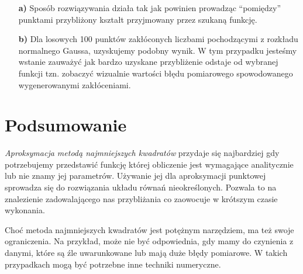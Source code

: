\documentclass{article}
\begin{document}
    \begin{enumerate}
      \item[\bf{a)}] Sposób rozwiązywania działa tak jak powinien prowadząc ``pomiędzy'' punktami przybliżony kształt przyjmowany przez szukaną funkcję.
      \item[\bf{b)}] Dla losowych 100 punktów zakłóconych liczbami pochodzącymi z rozkładu normalnego Gaussa, uzyskujemy podobny wynik. W tym przypadku jesteśmy wstanie zauważyć jak bardzo uzyskane przybliżenie odstaje od wybranej funkcji tzn. zobaczyć wizualnie wartości błędu pomiarowego spowodowanego wygenerowanymi zakłóceniami.
    \end{enumerate}


  \section{Podsumowanie}
  \textit{Aproksymacja metodą najmniejszych kwadratów} przydaje się najbardziej gdy potrzebujemy przedstawić funkcję której obliczenie jest wymagające analitycznie lub nie znamy jej parametrów. Używanie jej dla aproksymacji punktowej sprowadza się do rozwiązania układu równań nieokreślonych. Pozwala to na znalezienie zadowalającego nas przybliżania co zaowocuje w krótszym czasie wykonania.

  Choć metoda najmniejszych kwadratów jest potężnym narzędziem, ma też swoje ograniczenia. Na przykład, może nie być odpowiednia, gdy mamy do czynienia z danymi, które są źle uwarunkowane lub mają duże błędy pomiarowe. W takich przypadkach mogą być potrzebne inne techniki numeryczne.
\end{document}
